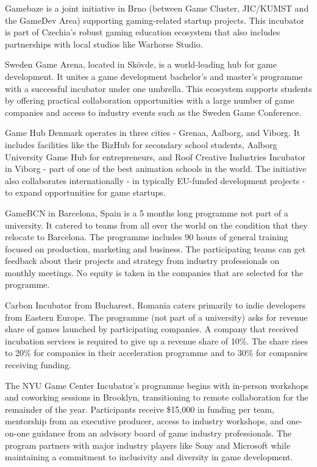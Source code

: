 Gamebaze is a joint initiative in Brno (between Game Cluster, JIC/KUMST and the GameDev Area) supporting gaming-related startup projects. This incubator is part of Czechia's robust gaming education ecosystem that also includes partnerships with local studios like Warhorse Studio.

Sweden Game Arena, located in Skövde, is a world-leading hub for game development. It unites a game development bachelor's and master's programme with a successful incubator under one umbrella. This ecosystem supports students by offering practical collaboration opportunities with a large number of game companies and access to industry events such as the Sweden Game Conference.

Game Hub Denmark operates in three cities - Grenaa, Aalborg, and Viborg. It includes facilities like the BizHub for secondary school students, Aalborg University Game Hub for entrepreneurs, and Roof Creative Industries Incubator in Viborg - part of one of the best animation schools in the world. The initiative also collaborates internationally - in typically EU-funded development projects - to expand opportunities for game startups.

GameBCN in Barcelona, Spain is a 5 months long programme not part of a university. It catered to teams from all over the world on the condition that they relocate to Barcelona. The programme includes 90 hours of general training focused on production, marketing and business. The participating teams can get feedback about their projects and strategy from industry professionals on monthly meetings. No equity is taken in the companies that are selected for the programme.

Carbon Incubator from Bucharest, Romania caters primarily to indie developers from Eastern Europe. The programme (not part of a university) asks for revenue share of games launched by participating companies. A company that received incubation services is required to give up a revenue share of 10\%. The share rises to 20\% for companies in their acceleration programme and to 30\% for companies receiving funding.

The NYU Game Center Incubator’s programme begins with in-person workshops and coworking sessions in Brooklyn, transitioning to remote collaboration for the remainder of the year. Participants receive \$15,000 in funding per team, mentorship from an executive producer, access to industry workshops, and one-on-one guidance from an advisory board of game industry professionals. The program partners with major industry players like Sony and Microsoft while maintaining a commitment to inclusivity and diversity in game development.
